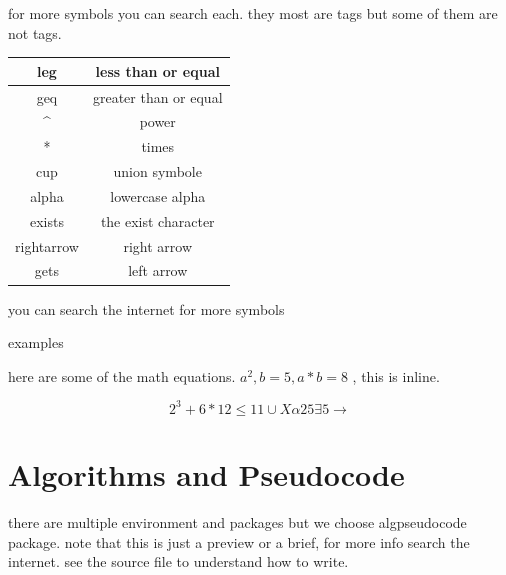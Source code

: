\documentclass{article} %
\begin{document}
    for more symbols you can search each. they most are tags but some of them are not tags.
    
    \smallskip
    
    \begin{tabular}{| c | c |}
        \hline
        leg & less than or equal\\
        \hline
        geq & greater than or equal\\
        \hline
        \^{} & power\\
        \hline
        * & times\\
        \hline
        cup & union symbole\\
        \hline
        alpha & lowercase alpha\\
        \hline
        exists & the exist character\\
        \hline
        rightarrow & right arrow\\
        \hline
        gets & left arrow\\
        \hline
        
    \end{tabular}
    \smallskip
    
    you can search the internet for more symbols
    
    \noindent examples
    
    here are some of the math equations. $a^{2} , b=5 , a*b=8$ , this is inline.
    
    \begin{equation}[htbp]
        2^3+6*12 \leq 11 \cup X \alpha 25 \exists 5 \rightarrow
    \label{eq:name}    
    \end{equation}
    
    
\section{Algorithms and Pseudocode}    
    
    
    there are multiple environment and packages but we choose algpseudocode package. note that this is just a preview or a brief, for more info search the internet. see the source file to understand how to write.
    
\end{document}
